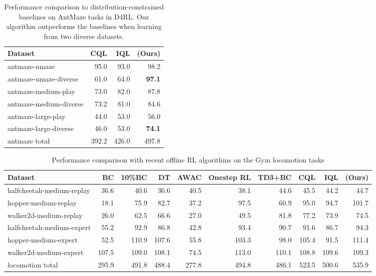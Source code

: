 \begin{table}[!htp]\centering
\caption{Performance comparison to distribution-constrained baselines on AntMaze tasks in D4RL. Our algorithm outperforms the baselines when learning from two diverse datasets.}\label{tab:d4rl_antmaze}
\small
\begin{tabular}{l||rr|r}
Dataset  &CQL & IQL & \name{} (Ours) \\\hline
antmaze-umaze & 95.0 & 93.0 & 98.2  \\
antmaze-umaze-diverse  & 61.0 & 64.0 & \textbf{97.1} \\
antmaze-medium-play & 73.0 & 82.0 & 87.8 \\
antmaze-medium-diverse & 73.2 & 81.0 & 84.6 \\
antmaze-large-play & 44.0 & 53.0 & 56.0 \\
antmaze-large-diverse & 46.0 & 53.0 & \textbf{74.1} \\ \hline
antmaze total & 392.2 & 426.0 & 497.8 \\ 
\hline 
\end{tabular}
\end{table}
\begin{table}[!htp]\centering
\caption{Performance comparison with recent offline RL algorithms on the Gym locomotion tasks}\label{tab:d4rl_locomotion}
\scriptsize
\setlength{\tabcolsep}{0.7em}
\begin{tabular}{l||rrrrrrrr|r}
Dataset &BC &10\%BC &DT &AWAC &Onestep RL &TD3+BC &CQL & IQL & \name{} (Ours) \\\hline
halfcheetah-medium-replay & 36.6 &40.6 &36.6 &40.5 &38.1 & 44.6 & 45.5 & 44.2 & 44.7  \\
hopper-medium-replay & 18.1 &75.9 &82.7 &37.2 & 97.5 &60.9 & 95.0 & 94.7 & 101.7  \\
walker2d-medium-replay & 26.0 &62.5 &66.6 &27.0 &49.5 & 81.8 &77.2 & 73.9 & 74.5 \\
halfcheetah-medium-expert & 55.2 & 92.9 &86.8 &42.8 & 93.4 & 90.7 & 91.6 & 86.7 & 94.3  \\
hopper-medium-expert & 52.5 & 110.9 & 107.6 &55.8 &103.3 &98.0 & 105.4 &91.5 & 111.4 \\
walker2d-medium-expert & 107.5 & 109.0 & 108.1 & 74.5 & 113.0 & 110.1 & 108.8 & 109.6 & 109.3  \\ \hline
locomotion total & 295.9 & 491.8 & 488.4 & 277.8 & 494.8 & 486.1 & 523.5 & 500.6 & 535.9 \\
\hline
\end{tabular}
\end{table}


